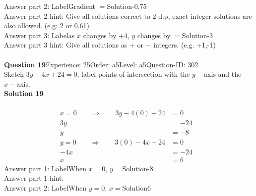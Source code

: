 \documentclass{article}
\begin{document}
Answer part 2: \hspace{10pt}Label\hspace{10pt}Gradient $=$\hspace{10pt}Solution\hspace{10pt}-0.75\\
Answer part 2 hint: \hspace{15pt}Give all solutions correct to 2 d.p, exact integer solutions are also allowed. (e.g: 2 or 0.61)\\
Answer part 3: \hspace{10pt}Label\hspace{10pt}as $x$ changes by $+4$, $y$ changes by $=$\hspace{10pt}Solution\hspace{10pt}-3\\
Answer part 3 hint: \hspace{15pt}Give all solutions as $+$ or $-$ integers. (e.g. +1,-1)\\
\\[4pt]
\noindent\textbf{Question 19}\hspace{20pt}Experience: 25\hspace{20pt}Order: a5\hspace{20pt}Level: a5\hspace{20pt}Question-ID: 302\\[2pt]
Sketch $3y-4x+24=0$, label points of intersection with the $y-$axis and the $x-$axis.\\[4pt]
\noindent\textbf{Solution 19}\\[2pt]
\\[-35pt]\begin{align*}
x=0\qquad\Rightarrow\qquad 3y-4(0)+24&=0&\\[2pt]
3y&=-24\\[2pt]
y&=-8\\[12pt]
y=0\qquad\Rightarrow\qquad 3(0)-4x+24&=0&\\[2pt]
-4x&=-24\\[2pt]
x&=6
\end{align*}
Answer part 1: \hspace{10pt}Label\hspace{10pt}When $x=0$, $y=$\hspace{10pt}Solution\hspace{10pt}-8\\
Answer part 1 hint: \hspace{15pt}\\
Answer part 2: \hspace{10pt}Label\hspace{10pt}When $y=0$, $x=$\hspace{10pt}Solution\hspace{10pt}6\\
\end{document}
